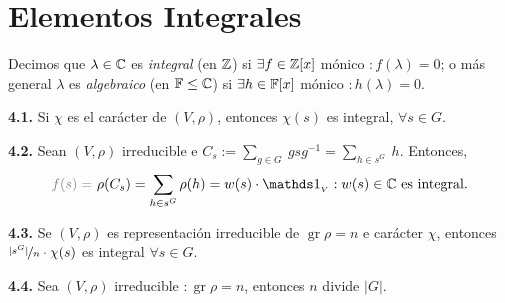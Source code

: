 \section{Elementos Integrales}

\begin{definition}
    Decimos que \(\lambda \in \mathbb{C}\) es \emph{integral} (en \(\mathbb{Z}\)) si \(\exists f \in \mathbb{Z}[x]\) mónico \( : f(\lambda) = 0\); o más general \(\lambda \) es \emph{algebraico} (en \(\mathbb{F}\leq \mathbb{C}\)) si \(\exists h \in \mathbb{F}[x]\) mónico \(: h(\lambda) = 0\). 
\end{definition}

\begin{lemma}
    \textbf{4.1.} Si \(\chi\) es el carácter de \((V,\rho)\), entonces \(\chi(s) \) es integral, \(\forall s \in G\). 
\end{lemma}

\begin{theorem}
    \textbf{4.2.} Sean \((V,\rho)\) irreducible e \(C_s :=\underset{g \in G}{\sum} \ gsg^{-1} = \underset{h \in s^G}{\sum} \ h\). Entonces,
    \[\textcolor{gray}{f(s) = } \  \rho(C_s) = \sum_{h \in s^G} \rho(h) = w(s) \cdot \id_{_V} : w(s)\in \C \text{ es integral}. \]
\end{theorem}


\begin{corollary}
    \textbf{4.3.} Se \((V,\rho)\) es representación irreducible de \(\operatorname{gr}\rho = n \) e carácter \(\chi\), entonces \(\nicefrac{|s^G|}{n} \cdot \chi(s)\) es integral \(\forall s \in G\). 
\end{corollary}

\begin{corollary}
    \textbf{4.4.} Sea \((V, \rho)\) irreducible \( : \operatorname{gr}\rho = n\), entonces \(n \) divide \(|G|\).  
\end{corollary}

